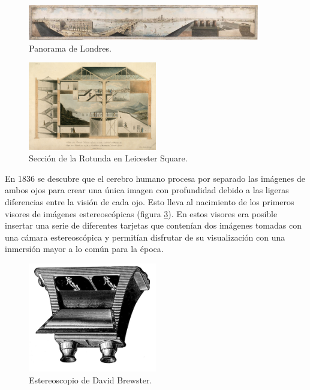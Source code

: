 \begin{figure}
  \centering
\includegraphics[width=0.9\textwidth]{03.EstudioProblema/01.EstadoArte/00.Figuras/12.panorama_london.jpg}
    \caption{Panorama de Londres. \cite{EA_img_london}}
    \label{fig:EA_london}
\end{figure}

\begin{figure}
  \centering
\includegraphics[width=0.5\textwidth]{03.EstudioProblema/01.EstadoArte/00.Figuras/13.panorama_rotunda.jpg}
    \caption{Sección de la Rotunda en Leicester Square. \cite{EA_img_rotunda}}
    \label{fig:EA_rotunda}
\end{figure}


\label{par:estadoArte:estereoscopio}
En 1836 se descubre que el cerebro humano procesa por separado las imágenes de ambos ojos para crear una única imagen con profundidad debido a las ligeras diferencias entre la visión de cada ojo. Esto lleva al nacimiento de los primeros visores de imágenes estereoscópicas (figura \ref{fig:EA_estereoscopio}). En estos visores era posible insertar una serie de diferentes tarjetas que contenían dos imágenes tomadas con una cámara estereoscópica y permitían disfrutar de su visualización con una inmersión mayor a lo común para la época.


\begin{figure}
  \centering
\includegraphics[width=0.5\textwidth]{03.EstudioProblema/01.EstadoArte/00.Figuras/14.panorama_estereoscopico.jpg}
    \caption{Estereoscopio de David Brewster. \cite{EA_img_estereoscopio}}
    \label{fig:EA_estereoscopio}
\end{figure}




